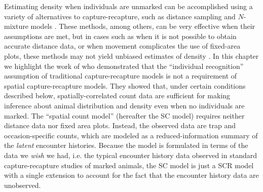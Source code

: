Estimating density when individuals are unmarked can be accomplished
using a variety of alternatives to capture-recapture, such as distance
sampling \citep{buckland_etal:2001} and $N$-mixture models
\citep{royle:2004biom}. 
These methods, among others, can be
very effective when their assumptions are met, but in cases such as
when it is not possible to obtain accurate distance data, or when
movement complicates the use of fixed-area plots,
these methods may not yield unbiased estimates of density
\citep{chandler_etal:2011}. 
In this chapter we highlight the work of
\citet{chandler_royle:2012} who demonstrated that the ``individual
recognition'' assumption of traditional capture-recapture models is not a
requirement of spatial capture-recapture models. They showed that,
under certain conditions described below, spatially-correlated count
data are sufficient for making inference about animal distribution and
density even when no individuals are marked.
The \citet{chandler_royle:2012} ``spatial count model'' (hereafter the SC
model) requires neither distance data nor fixed area plots. Instead,
the observed data are trap and occasion-specific counts, which
are modeled as a reduced-information summary of the \textit{latent}
encounter histories. Because the model is formulated in terms of the
data we {\it wish} we had, i.e. the typical encounter history data observed
in standard capture-recapture studies of marked animals, the SC model
is just a SCR model with a single extension to account for the fact
that the encounter history data are unobserved.

